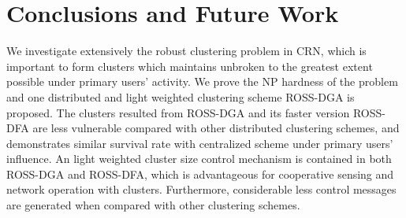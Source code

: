 \begin{comment}
\begin{figure}[t]
\begin{center}

\subfigure[100 PRns, varying CRns]{\label{result2:1}\texttt{[image: CR\_ICC\_3curves.pdf]}}
\subfigure[100 PRns, varying CRns]{\label{result2:2}\texttt{[image: CR\_OCC\_3curves.pdf]}}
 \end{center}
\caption[]{Connectivity robustness of ICCs and OCCs with varying density of CR nodes.} %
\label{result2}
\end{figure}

\begin{figure}[ht!]
\begin{center}
\subfigure[100 CRns, 100 PRns]{\label{result3:1}\texttt{[image: distribution\_1\_matlab.pdf]}}
\subfigure[200 CRns, 100 PRns]{\label{result3:2}\texttt{[image: distribution\_2\_matlab.pdf]}}
 \end{center}
\caption[]{Distribution of cluster sizes for two fixed scenarios.} %
\label{result3}
\end{figure}	

\end{comment}


\section{Conclusions and Future Work}
\label{conclusion}
We investigate extensively the robust clustering problem in CRN, which is important to form clusters which maintains unbroken to the greatest extent possible under primary users' activity.
We prove the NP hardness of the problem and one distributed and light weighted clustering scheme ROSS-DGA is proposed.
The clusters resulted from ROSS-DGA and its faster version ROSS-DFA are less vulnerable compared with other distributed clustering schemes, and demonstrates similar survival rate with centralized scheme under primary users' influence.
An light weighted cluster size control mechanism is contained in both ROSS-DGA and ROSS-DFA, which is advantageous for cooperative sensing and network operation with clusters.
Furthermore, considerable less control messages are generated when compared with other clustering schemes.



